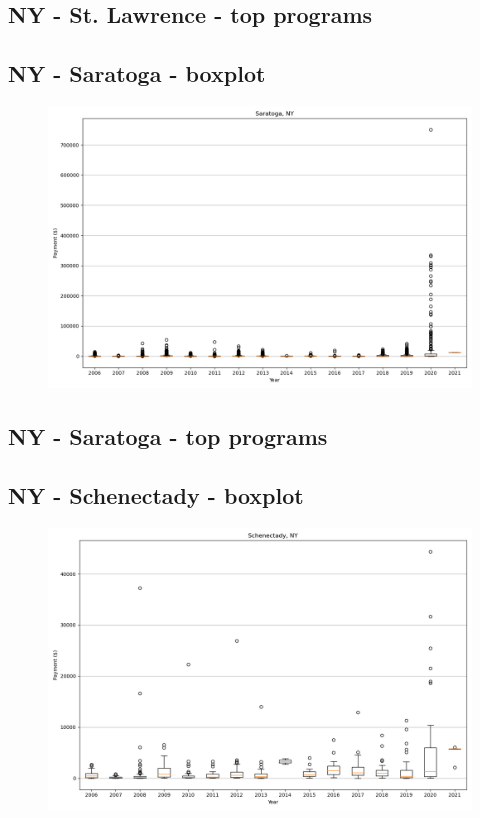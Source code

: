\subsection*{NY - St. Lawrence - top programs}

\newpage
\subsection*{NY - Saratoga - boxplot}
\begin{figure}[h]
\centering
\includegraphics[width=7in]{../output/boxplots/counties/Saratoga-NY_boxplot.png}
\end{figure}


\subsection*{NY - Saratoga - top programs}

\newpage
\subsection*{NY - Schenectady - boxplot}
\begin{figure}[h]
\centering
\includegraphics[width=7in]{../output/boxplots/counties/Schenectady-NY_boxplot.png}
\end{figure}


